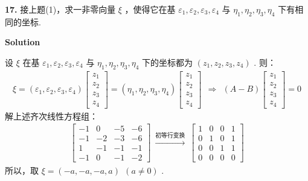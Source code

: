 \documentclass[11pt,a4paper,openany,oneside]{book}
\newcommand\Solution{\noindent\textbf{\textsf{Solution}}\par\medskip}
\begin{document}
\begin{myexample}
	\textbf{17.} 
接上题(1)，求一非零向量 $ \xi $ ，使得它在基 $ \varepsilon_1, \varepsilon_2, \varepsilon_3, \varepsilon_4 $ 与 $ \eta_1, \eta_2, \eta_3, \eta_4 $ 下有相同的坐标.   \\ 

\end{myexample}
\Solution

设 $ \xi $ 在基 $ \varepsilon_1, \varepsilon_2, \varepsilon_3, \varepsilon_4 $ 与 $ \eta_1, \eta_2, \eta_3, \eta_4 $ 下的坐标都为 $ (z_1, z_2, z_3, z_4) $ . 则：
\begin{gather*}
\xi = (\varepsilon_1, \varepsilon_2, \varepsilon_3, \varepsilon_4)
\begin{bmatrix}
z_1 \\ z_2 \\ z_3 \\ z_4 
\end{bmatrix} = 
(\eta_1, \eta_2, \eta_3, \eta_4)
\begin{bmatrix}
z_1 \\ z_2 \\ z_3 \\ z_4 
\end{bmatrix} \ \ \Rightarrow \ \ 
(A - B) 
\begin{bmatrix}
z_1 \\ z_2 \\ z_3 \\ z_4 
\end{bmatrix}
= 0
\end{gather*}
解上述齐次线性方程组：
\begin{gather*}
\begin{bmatrix}
-1 & 0 & -5 & -6 \\
-1 & -2 & -3 & -6 \\
1 & -1 & -1 & -1 \\
-1 & 0 & -1 & -2 
\end{bmatrix} \ \xrightarrow{\text{初等行变换}} \ 
\begin{bmatrix}
1   &  0  &   0   &  1 \\
0   &  1   &  0  &   1  \\
0    & 0  &   1   &  1  \\
0     &0 &    0   &  0
\end{bmatrix}
\end{gather*}
所以，取 $ \xi = (-a, -a, -a, a) \ \ (a \neq 0)  $ .  \\  \\  
\end{document}
